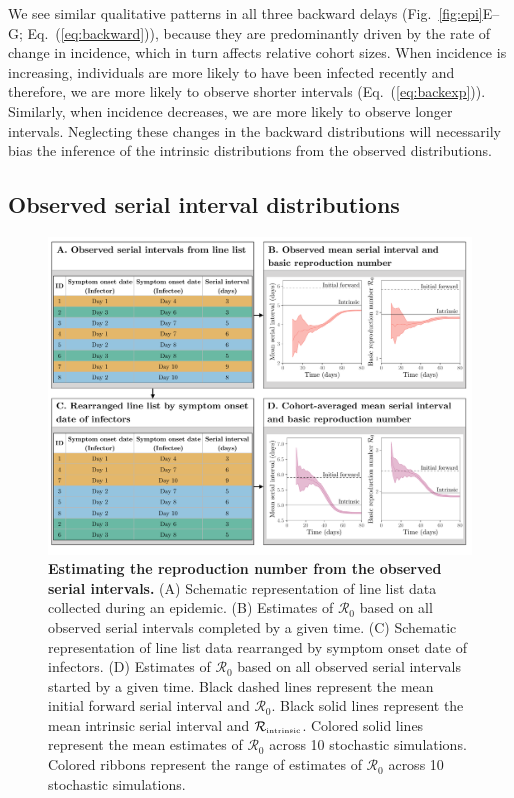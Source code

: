 \documentclass[12pt]{article}
\newcommand{\eref}[1]{Eq.~(\ref{eq:#1})}
\newcommand{\fref}[1]{Fig.~\ref{fig:#1}}
\newcommand{\Rx}[1]{\ensuremath{{\mathcal R}_{#1}}\xspace}
\newcommand{\Ro}{\Rx{0}}
\newcommand{\Rintrinsic}{\ensuremath{{\mathcal R}_{\textrm{\tiny intrinsic}}}\xspace}
\begin{document}
We see similar qualitative patterns in all three backward delays (\fref{epi}E--G; \eref{backward}), because they are predominantly driven by the rate of change in incidence, which in turn affects relative cohort sizes.
When incidence is increasing, individuals are more likely to have been infected recently and therefore, we are more likely to observe shorter intervals (\eref{backexp}).
Similarly, when incidence decreases, we are more likely to observe longer intervals.
Neglecting these changes in the backward distributions will necessarily bias the inference of the intrinsic distributions from the observed distributions.

\subsection{Observed serial interval distributions}

\begin{figure}[!ht]
\includegraphics[width=\textwidth]{diagram.pdf}
\caption{
\textbf{Estimating the reproduction number from the observed serial intervals.}
(A) Schematic representation of line list data collected during an epidemic.
(B) Estimates of \Ro based on all observed serial intervals completed by a given time.
(C) Schematic representation of line list data rearranged by symptom onset date of infectors.
(D) Estimates of \Ro based on all observed serial intervals started by a given time. 
Black dashed lines represent the mean initial forward serial interval and \Ro.
Black solid lines represent the mean intrinsic serial interval and \Rintrinsic.
Colored solid lines represent the mean estimates of \Ro across 10 stochastic simulations.
Colored ribbons represent the range of estimates of \Ro across 10 stochastic simulations.
}
\label{fig:obsrR}
\end{figure}
\end{document}
